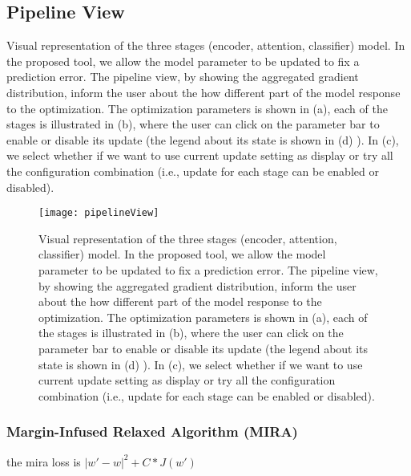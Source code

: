 \subsection{Pipeline View}
\label{sec:pipeline}
Visual representation of the three stages (encoder, attention, classifier) model. In the proposed tool, we allow the model parameter to be updated to fix a prediction error. The pipeline view, by showing the aggregated gradient distribution, inform the user about the how different part of the model response to the optimization.
%
The optimization parameters is shown in (a), each of the stages is illustrated in (b), where the user can click on the parameter bar to enable or disable its update (the legend about its state is shown in (d) ). In (c), we select whether if we want to use current update setting as display or try all the configuration combination (i.e., update for each stage can be enabled or disabled).

\begin{figure}[htbp]
\centering
\vspace{-2mm}
 \texttt{[image: pipelineView]}
 \caption{
Visual representation of the three stages (encoder, attention, classifier) model. In the proposed tool, we allow the model parameter to be updated to fix a prediction error. The pipeline view, by showing the aggregated gradient distribution, inform the user about the how different part of the model response to the optimization.
%
The optimization parameters is shown in (a), each of the stages is illustrated in (b), where the user can click on the parameter bar to enable or disable its update (the legend about its state is shown in (d) ). In (c), we select whether if we want to use current update setting as display or try all the configuration combination (i.e., update for each stage can be enabled or disabled).
 }
\label{fig:pipelineView}
\end{figure}

\subsubsection{Margin-Infused Relaxed Algorithm (MIRA)}
the mira loss is $|w' - w|^2 + C * J(w')$
